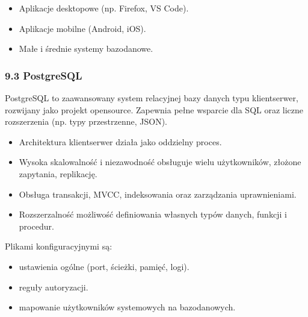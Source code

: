 \documentclass[a4paper,11pt,openany,english]{sphinxmanual}
\begin{document}
\sphinxAtStartPar
{}
\begin{itemize}
\item {} 
\sphinxAtStartPar
Aplikacje desktopowe (np. Firefox, VS Code).

\item {} 
\sphinxAtStartPar
Aplikacje mobilne (Android, iOS).

\item {} 
\sphinxAtStartPar
Małe i średnie systemy bazodanowe.

\end{itemize}


\subsubsection{9.3 PostgreSQL}
\label{\detokenize{rozdzial2/Konfiguracja_baz_danych/Konfiguracja_baz_danych:postgresql}}
\sphinxAtStartPar
PostgreSQL to zaawansowany system relacyjnej bazy danych typu klient\sphinxhyphen{}serwer, rozwijany jako projekt open\sphinxhyphen{}source. Zapewnia pełne wsparcie dla SQL oraz liczne rozszerzenia (np. typy przestrzenne, JSON).

\sphinxAtStartPar
{}
\begin{itemize}
\item {} 
\sphinxAtStartPar
Architektura klient\sphinxhyphen{}serwer \textendash{} działa jako oddzielny proces.

\item {} 
\sphinxAtStartPar
Wysoka skalowalność i niezawodność \textendash{} obsługuje wielu użytkowników, złożone zapytania, replikację.

\item {} 
\sphinxAtStartPar
Obsługa transakcji, MVCC, indeksowania oraz zarządzania uprawnieniami.

\item {} 
\sphinxAtStartPar
Rozszerzalność \textendash{} możliwość definiowania własnych typów danych, funkcji i procedur.

\end{itemize}

\sphinxAtStartPar
{}
Plikami konfiguracyjnymi są:
\begin{itemize}
\item {} 
\sphinxAtStartPar
{} \textendash{} ustawienia ogólne (port, ścieżki, pamięć, logi).

\item {} 
\sphinxAtStartPar
{} \textendash{} reguły autoryzacji.

\item {} 
\sphinxAtStartPar
{} \textendash{} mapowanie użytkowników systemowych na bazodanowych.

\end{itemize}
\end{document}
